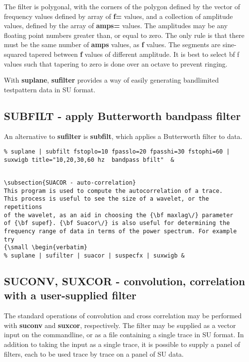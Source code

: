 {{{{{{{The filter is polygonal, with the corners of the polygon defined by
the vector of frequency values defined by array of {\bf f=\/} values,
and a collection of amplitude values, defined by the array of {\bf amps=\/}
values. The amplitudes may be any floating point numbers greater than,
or equal to zero. The only rule is that there must be the same number
of {\bf amps\/} values, as {\bf f\/} values.  The segments are sine-squared
tapered between {\bf f\/} values of different amplitude. It is
best to select {bf f\/} values such that tapering to zero is done
over an octave to prevent ringing.

With {\bf suplane\/}, {\bf sufilter\/} provides a way of easily
generating bandlimited testpattern data in SU format.

\subsection{SUBFILT - apply Butterworth bandpass filter}

An alternative to {\bf sufilter\/} is {\bf subfilt\/}, which
applies a Butterworth filter to data. 

{\small \begin{verbatim}
% suplane | subfilt fstoplo=10 fpasslo=20 fpasshi=30 fstophi=60 | suxwigb title="10,20,30,60 hz  bandpass bfilt"  &
\end{verbatim}}\noindent
{\small \begin{verbatim}

\subsection{SUACOR - auto-correlation}
This program is used to compute the autocorrelation of a trace.
This process is useful to see the size of a wavelet, or the repetitions
of the wavelet, as an aid in choosing the {\bf maxlag\/} parameter
of {\bf supef}. {\bf Suacor\/} is also useful for determining the
frequency range of data in terms of the power spectrum. For example
try
{\small \begin{verbatim}
% suplane | sufilter | suacor | suspecfx | suxwigb &
\end{verbatim}}\noindent

\subsection{SUCONV, SUXCOR - convolution, correlation with a user-supplied filter}

The standard operations of convolution and cross correlation may be
performed with {\bf suconv\/} and {\bf suxcor\/}, respectively.
The filter may be supplied as a vector input on the commandline,
or as a file containing a single trace in SU format. In addition
to taking the input as a single trace, it is possible to supply
a panel of filters, each to be used trace by trace on a panel of
SU data.

}}}}}}}
